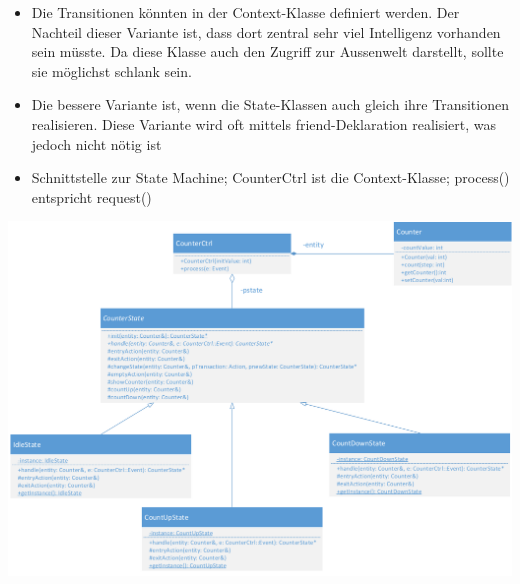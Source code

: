 \begin{itemize}
      \item Die Transitionen könnten in der Context-Klasse definiert werden. Der
            Nachteil dieser Variante ist, dass dort zentral sehr viel Intelligenz vorhanden
            sein müsste. Da diese Klasse auch den Zugriff zur Aussenwelt darstellt, sollte
            sie möglichst schlank sein.
      \item Die bessere Variante ist, wenn die State-Klassen auch gleich ihre
            Transitionen realisieren. Diese Variante wird oft mittels friend-Deklaration
            realisiert, was jedoch nicht nötig ist
      \item Schnittstelle zur State Machine; CounterCtrl ist die Context-Klasse; process() entspricht request()
\end{itemize}

\begin{center}
      \includegraphics[width=0.7\linewidth]{./images/FSM/klassendiagramm}
\end{center}

